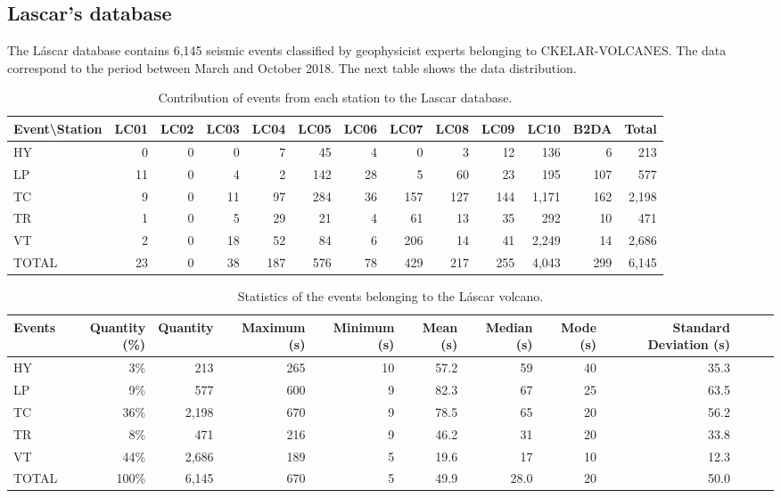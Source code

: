 \documentclass[journal]{IEEEtran}
\begin{document}
\subsection{Lascar's database}
The Láscar database contains 6,145 seismic events classified by geophysicist experts belonging to CKELAR-VOLCANES. The data correspond to the period between March and October 2018. The next table shows the data distribution.
\begin{table}
\caption{Contribution of events from each station to the Lascar database.} %
\centering
\begin{adjustbox}{width=\textwidth}
\begin{tabular}{lrrrrrrrrrrrr}
\hline\hline %
Event\textbackslash{}Station & LC01 & LC02 & LC03 & LC04 & LC05 & LC06 & LC07 & LC08 & LC09 & LC10 & B2DA & Total \\
\hline %
HY & 0 & 0 & 0 & 7 & 45 & 4 & 0 & 3 & 12 & 136 & 6 & 213 \\
LP & 11 & 0 & 4 & 2 & 142 & 28 & 5 & 60 & 23 & 195 & 107 & 577 \\
TC & 9 & 0 & 11 & 97 & 284 & 36 & 157 & 127 & 144 & 1,171 & 162 & 2,198 \\
TR & 1 & 0 & 5 & 29 & 21 & 4 & 61 & 13 & 35 & 292 & 10 & 471 \\
VT & 2 & 0 & 18 & 52 & 84 & 6 & 206 & 14 & 41 & 2,249 & 14 & 2,686 \\
\hline %
TOTAL & 23 & 0 & 38 & 187 & 576 & 78 & 429 & 217 & 255 & 4,043 & 299 & 6,145 \\
\hline %
\end{tabular}
\end{adjustbox}
\label{table:lascar_database}
\end{table}

\begin{table}
\caption{Statistics of the events belonging to the Láscar volcano.} %
\centering
\begin{tabular}{lrrrrrrrrrrr}
\hline\hline %
  Events & Quantity (\%) & Quantity & Maximum (s) & Minimum (s) & Mean (s) & Median (s) & Mode (s) & Standard Deviation (s)  \\
\hline %
HY & 3\% & 213 & 265 & 10 & 57.2 & 59 & 40 & 35.3 \\
LP & 9\% & 577 & 600 & 9 & 82.3 & 67 & 25 & 63.5 \\
TC & 36\% & 2,198 & 670 & 9 & 78.5 & 65 & 20 & 56.2 \\
TR & 8\% & 471 & 216 & 9 & 46.2 & 31 & 20 & 33.8 \\
VT & 44\% & 2,686 & 189 & 5 & 19.6 & 17 & 10 & 12.3 \\
\hline %
TOTAL & 100\% & 6,145 & 670 & 5 & 49.9 & 28.0 & 20 & 50.0 \\
\hline %
\end{tabular}
\label{table:lascar_statistics}
\end{table}
\end{document}
